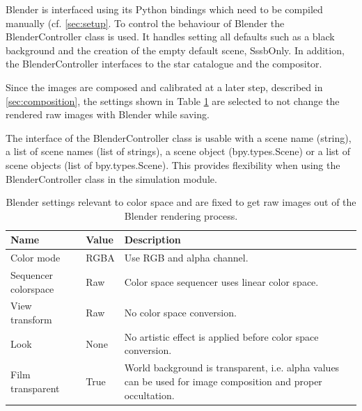 Blender is interfaced using its Python bindings which need to be compiled manually (cf. \ref{sec:setup}. To control the behaviour of Blender the BlenderController class is used. It handles setting all defaults such as a black background and the creation of the empty default scene, SssbOnly. In addition, the BlenderController interfaces to the star catalogue and the compositor.

Since the images are composed and calibrated at a later step, described in \ref{sec:composition}, the settings shown in Table \ref{tab:color_space} are selected to not change the rendered raw images with Blender while saving.

The interface of the BlenderController class is usable with a scene name (string), a list of scene names (list of strings), a scene object (bpy.types.Scene) or a list of scene objects (list of bpy.types.Scene). This provides flexibility when using the BlenderController class in the simulation module.

\begin{table}[htpb]
    \centering
    \caption{Blender settings relevant to color space and are fixed to get raw images out of the Blender rendering process.}
    \label{tab:color_space}
    \begin{tabular}{p{}|p{}|p{}}
        \textbf{Name}        & \textbf{Value} & \textbf{Description} \\ \hline
        Color mode           & RGBA           & Use RGB and alpha channel. \\
        Sequencer colorspace & Raw            & Color space sequencer uses linear color space. \\
        View transform       & Raw            & No color space conversion. \\
        Look                 & None           & No artistic effect is applied before color space conversion. \\
        Film transparent     & True           & World background is transparent, i.e. alpha values can be used for image composition and proper occultation.
    \end{tabular}
\end{table}

